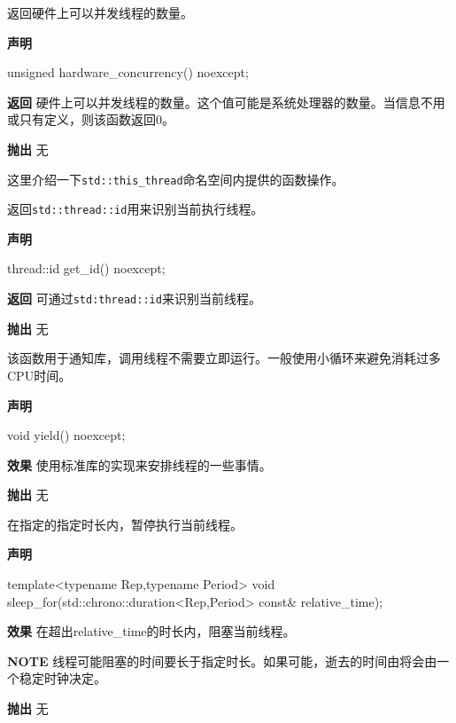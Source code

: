 返回硬件上可以并发线程的数量。

\textbf{声明}

\begin{cpp}
unsigned hardware_concurrency() noexcept;
\end{cpp}

\textbf{返回}
硬件上可以并发线程的数量。这个值可能是系统处理器的数量。当信息不用或只有定义，则该函数返回0。

\textbf{抛出}
无


这里介绍一下\texttt{std::this\_thread}命名空间内提供的函数操作。


返回\texttt{std::thread::id}用来识别当前执行线程。

\textbf{声明}

\begin{cpp}
thread::id get_id() noexcept;
\end{cpp}

\textbf{返回}
可通过\texttt{std:thread::id}来识别当前线程。

\textbf{抛出}
无


该函数用于通知库，调用线程不需要立即运行。一般使用小循环来避免消耗过多CPU时间。

\textbf{声明}

\begin{cpp}
void yield() noexcept;
\end{cpp}

\textbf{效果}
使用标准库的实现来安排线程的一些事情。

\textbf{抛出}
无


在指定的指定时长内，暂停执行当前线程。

\textbf{声明}

\begin{cpp}
template<typename Rep,typename Period>
void sleep_for(std::chrono::duration<Rep,Period> const& relative_time);
\end{cpp}

\textbf{效果}
在超出relative\_time的时长内，阻塞当前线程。

\textbf{NOTE} 线程可能阻塞的时间要长于指定时长。如果可能，逝去的时间由将会由一个稳定时钟决定。

\textbf{抛出}
无


